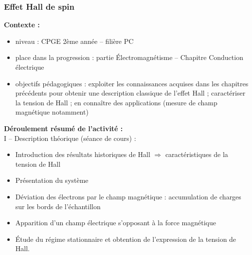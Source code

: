 \documentclass[a4paper,11pt]{article} %
\newenvironment{encart}[1]{%
	\begin{tcolorbox}
		[
		breakable, enhanced jigsaw, %
		arc = 1mm, %
		title = \textbf{#1}, %
		coltitle = white, %
		colbacktitle = blue, %
		colback = white, %
		colframe = blue %
		]
}{		
	\end{tcolorbox}
}
\begin{document}
	
	
	\subsubsection{Effet Hall de spin}
	
	\begin{encart}{Activité pédagogique 1 : étude de l'effet Hall classique}
		\textbf{Contexte :}
		\begin{itemize}
			\item niveau : CPGE 2ème année -- filière PC
			\item place dans la progression : partie \'Electromagnétisme -- Chapitre Conduction électrique
			\item objectifs pédagogiques : exploiter les connaissances acquises dans les chapitres précédents pour obtenir une description classique de l'effet Hall ; caractériser la tension de Hall ; en connaître des applications (mesure de champ magnétique notamment)
		\end{itemize}
		\vspace{0.5cm}
		
		\textbf{Déroulement résumé de l'activité :}\\
		
		I -- Description théorique (séance de cours) :
		\begin{itemize}
			\item Introduction des résultats historiques de Hall $ \Rightarrow $ caractéristiques de la tension de Hall
			\item Présentation du système
			\item Déviation des électrons par le champ magnétique : accumulation de charges sur les bords de l'échantillon
			\item Apparition d'un champ électrique s'opposant à la force magnétique
			\item \'Etude du régime stationnaire et obtention de l'expression de la tension de Hall.
		\end{itemize}
		\vspace{0.5cm}
		

\end{encart}
\end{document}
